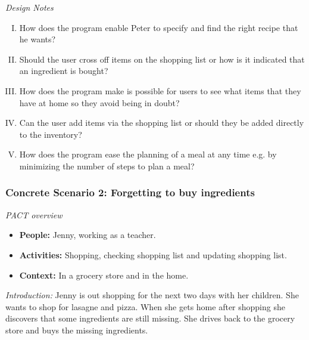 \emph{Design Notes}

\begin{enumerate} [(I)]
\item How does the program enable Peter to specify and find the right recipe that he wants?
\item Should the user cross off items on the shopping list or how is it indicated that an ingredient is bought?
\item  How does the program make is possible for users to see what items that they have at home so they avoid being in doubt?
\item Can the user add items via the shopping list or should they be added directly to the inventory?
\item How does the program ease the planning of a meal at any time e.g. by minimizing the number of steps to plan a meal?
\end{enumerate}

\subsubsection{Concrete Scenario 2: Forgetting to buy ingredients}\label{ConcreteScenario2}

\emph{PACT overview}
\begin{itemize}
\item \textbf{People:} Jenny, working as a teacher.
\item \textbf{Activities:} Shopping, checking shopping list and updating shopping list. 
\item \textbf{Context:} In a grocery store and in the home.
\end{itemize}

\emph{Introduction:} Jenny is out shopping for the next two days with her children. She wants to shop for lasagne and pizza. When she gets home after shopping she discovers that some ingredients are still missing. She drives back to the grocery store and buys the missing ingredients. 

